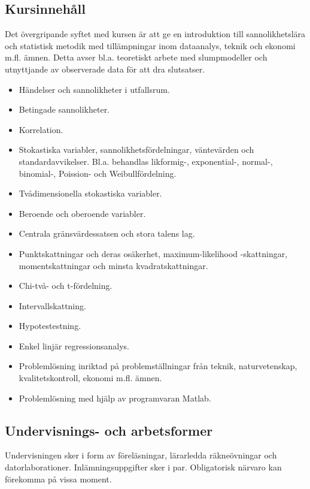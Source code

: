 \subsection*{Kursinnehåll}

Det övergripande syftet med kursen är att ge en introduktion till
sannolikhetslära och statistisk metodik med tillämpningar inom
dataanalys, teknik och ekonomi m.fl. ämnen. Detta avser bl.a. teoretiskt
arbete med slumpmodeller och utnyttjande av observerade data för att dra
slutsatser.

\begin{itemize}
\tightlist
\item
  Händelser och sannolikheter i utfallsrum.
\item
  Betingade sannolikheter.
\item
  Korrelation.
\item
  Stokastiska variabler, sannolikhetsfördelningar, väntevärden och
  standardavvikelser. Bl.a. behandlas likformig-, exponential-, normal-,
  binomial-, Poission- och Weibullfördelning.
\item
  Tvådimensionella stokastiska variabler.
\item
  Beroende och oberoende variabler.
\item
  Centrala gränsvärdessatsen och stora talens lag.
\item
  Punktskattningar och deras osäkerhet, maximum-likelihood -skattningar,
  momentskattningar och minsta kvadratskattningar.
\item
  Chi-två- och t-fördelning.
\item
  Intervallskattning.
\item
  Hypotestestning.
\item
  Enkel linjär regressionsanalys.
\item
  Problemlösning inriktad på problemställningar från teknik,
  naturvetenskap, kvalitetskontroll, ekonomi m.fl. ämnen.
\item
  Problemlösning med hjälp av programvaran Matlab.
\end{itemize}

\subsection*{Undervisnings- och
arbetsformer}

Undervisningen sker i form av föreläsningar, lärarledda räkneövningar
och datorlaborationer. Inlämningsuppgifter sker i par. Obligatorisk
närvaro kan förekomma på vissa moment.

